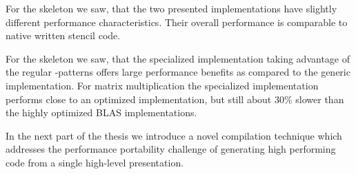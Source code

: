 For the \stencil skeleton we saw, that the two presented implementations have slightly different performance characteristics.
Their overall performance is comparable to native written stencil code.

For the \allpairs skeleton we saw, that the specialized implementation taking advantage of the regular \zip-\reduce patterns offers large performance benefits as compared to the generic implementation.
For matrix multiplication the specialized implementation performs close to an optimized \OpenCL implementation, but still about 30\% slower than the highly optimized BLAS implementations.

In the next part of the thesis we introduce a novel compilation technique which addresses the performance portability challenge of generating high performing code from a single high-level presentation.

